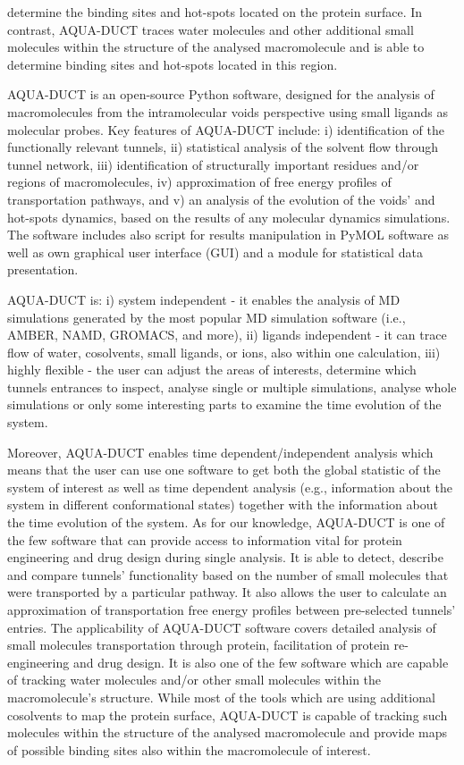 \documentclass[9pt,tutorial, pubversion]{livecoms}
\begin{document}
determine the binding sites and hot-spots located on the protein surface. In contrast, AQUA-DUCT traces water molecules and other additional small molecules within the structure of the analysed macromolecule and is able to determine binding sites and hot-spots located in this region. 

AQUA-DUCT is an open-source Python software, designed for the analysis of macromolecules from the intramolecular voids perspective using small ligands as molecular probes. Key features of AQUA-DUCT include: i) identification of the functionally relevant tunnels, ii) statistical analysis of the solvent flow through tunnel network, iii) identification of structurally important residues and/or regions of macromolecules, iv) approximation of free energy profiles of transportation pathways, and v) an analysis of the evolution of the voids’ and hot-spots dynamics, based on the results of any molecular dynamics simulations. The software includes also script for results manipulation in PyMOL \cite{Delano2002} software as well as own graphical user interface (GUI) and a module for statistical data presentation. 

AQUA-DUCT is:
\newline
i) system independent - it enables the analysis of MD simulations generated by the most popular MD simulation software (i.e., AMBER, NAMD, GROMACS, and more), 
\newline
ii) ligands independent - it can trace flow of water, cosolvents, small ligands, or ions, also within one calculation, 
\newline
iii) highly flexible - the user can adjust the areas of interests, determine which tunnels entrances to inspect, analyse single or multiple simulations, analyse whole simulations or only some interesting parts to examine the time evolution of the system. 

Moreover, AQUA-DUCT enables time dependent/independent analysis which means that the user can use one software to get both the global statistic of the system of interest as well as time dependent analysis (e.g., information about the system in different conformational states) together with the information about the time evolution of the system. As for our knowledge, AQUA-DUCT is one of the few software that can provide access to information vital for protein engineering and drug design during single analysis. It is able to detect, describe and compare tunnels' functionality based on the number of small molecules that were transported by a particular pathway. It also allows the user to calculate an approximation of transportation free energy profiles between pre-selected tunnels’ entries. The applicability of AQUA-DUCT software covers detailed analysis of small molecules transportation through protein, facilitation of protein re-engineering and drug design. It is also one of the few software which are capable of tracking water molecules and/or other small molecules within the macromolecule's structure. While most of the tools which are using additional cosolvents to map the protein surface, AQUA-DUCT is capable of tracking such molecules within the structure of the analysed macromolecule and provide maps of possible binding sites also within the macromolecule of interest. 
\end{document}
